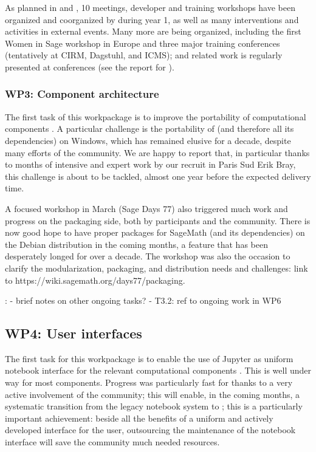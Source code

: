 \documentclass{deliverablereport}
\newcommand{\TODO}[1]{{\color{red}{TODO}: #1}}
\begin{document}
As planned in  and
, 10 meetings, developer and training
workshops have been organized and coorganized by \ODK during year 1,
as well as many interventions and activities in external events.
Many more are being organized, including the first Women in Sage
workshop in Europe and three major training conferences (tentatively
at CIRM, Dagstuhl, and ICMS); \ODK and \ODK related work is regularly
presented at conferences (see the report for
).


\subsubsection{WP3: Component architecture}

The first task of this workpackage is to improve the portability of
computational components
. A particular challenge
is the portability of \Sage (and therefore all its dependencies)
on Windows, which has remained elusive for a decade, despite many
efforts of the community. We are happy to report that, in particular
thanks to months of intensive and expert work by our recruit in Paris
Sud Erik Bray, this challenge is about to be tackled, almost one year
before the expected delivery time.

A focused workshop in March (Sage Days 77) also triggered much work
and progress on the packaging side, both by \ODK participants and the
community. There is now good hope to have proper packages for SageMath
(and its dependencies) on the Debian distribution in the coming
months, a feature that has been desperately longed for over a decade.
The workshop was also the occasion to clarify the modularization,
packaging, and distribution needs and challenges\TODO{link to
https://wiki.sagemath.org/days77/packaging}.

\TODO{
- brief notes on other ongoing tasks?
- T3.2: ref to ongoing work in WP6
}
\subsection{WP4: User interfaces}

The first task for this workpackage is to enable the use of Jupyter as
uniform notebook interface for the relevant computational components
. This is well under way for most
components. Progress was particularly fast for \Sage thanks to a
very active involvement of the community; this will enable, in the
coming months, a systematic transition from the legacy \Sage
notebook system to \Jupyter; this is a particularly important
achievement: beside all the benefits of a uniform and actively
developed interface for the user, outsourcing the maintenance of the
notebook interface will save the \Sage community much needed
resources.
\end{document}
